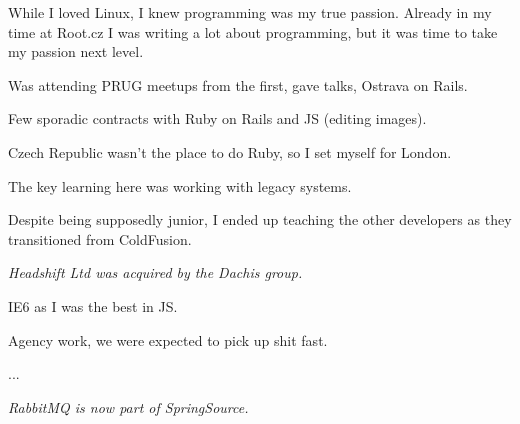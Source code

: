 \startitemize
  \item While I loved Linux, I knew programming was my true passion. Already in my time at Root.cz I was writing a lot about programming, but it was time to take my passion next level.
  \item Was attending PRUG meetups from the first, gave talks, Ostrava on Rails.
  \item Few sporadic contracts with Ruby on Rails and JS (editing images).
\stopitemize

\startitemize
  \item Czech Republic wasn't the place to do Ruby, so I set myself for London.
  \item The key learning here was working with legacy systems.
  \item Despite being supposedly junior, I ended up teaching the other developers as they transitioned from ColdFusion.
\stopitemize

{\em Headshift Ltd was acquired by the Dachis group.}

\startitemize
  \item IE6 as I was the best in JS.
  \item Agency work, we were expected to pick up shit fast.
  \item ...
\stopitemize

{\em RabbitMQ is now part of SpringSource.}

